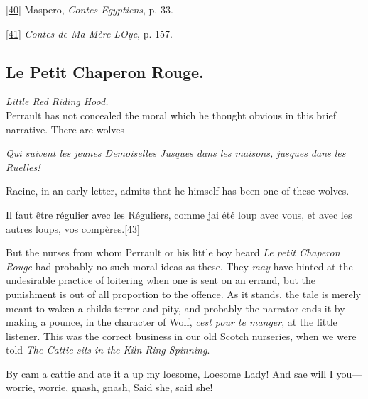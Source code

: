 \documentclass[14pt,a4paper]{memoir}
\begin{document}
\protect\hypertarget{4533318093929944247_33931-h-0.htm.xhtmlux5cux23Footnote_40}{}{}\protect\hyperlink{4533318093929944247_33931-h-0.htm.xhtmlux5cux23FNanchor_40}{{{[}40{]}}}
Maspero, \emph{Contes Egyptiens}, p. 33.

\protect\hypertarget{4533318093929944247_33931-h-0.htm.xhtmlux5cux23Footnote_41}{}{}\protect\hyperlink{4533318093929944247_33931-h-0.htm.xhtmlux5cux23FNanchor_41}{{{[}41{]}}}
\emph{Contes de Ma Mère L\textquotesingle Oye}, p. 157.

\subsection{Le Petit Chaperon Rouge.}

\emph{Little Red Riding Hood.} \\

Perrault has not concealed the moral which he thought obvious in this
brief narrative. There are wolves---

\emph{{\textquotesingle Qui suivent les jeunes Demoiselles} {Jusques
dans les maisons, jusques dans les Ruelles!\textquotesingle{}}}

Racine, in an early letter, admits that he himself has been one of these
wolves.

\textquotesingle Il faut être régulier avec les Réguliers, comme
j\textquotesingle ai été loup avec vous, et avec les autres loups, vos
compères.\protect\hypertarget{4533318093929944247_33931-h-0.htm.xhtmlux5cux23FNanchor_43}{}{}\protect\hyperlink{4533318093929944247_33931-h-0.htm.xhtmlux5cux23Footnote_43}{{[}43{]}}\textquotesingle{}

But the nurses from whom Perrault or his little boy heard \emph{Le petit
Chaperon Rouge} had probably no such moral ideas as these. They
\emph{may} have hinted at the undesirable practice of loitering when one
is sent on an errand, but the punishment is out of all proportion to the
offence. As it stands, the tale is merely meant to waken a
child\textquotesingle s terror and pity, and probably the narrator ends
it by making a pounce, in the character of Wolf,
\emph{c\textquotesingle est pour te manger}, at the little listener.
This was the correct \textquotesingle business\textquotesingle{} in our
old Scotch nurseries, when we were told \emph{The Cattie sits in the
Kiln-Ring Spinning}.

{\textquotesingle By cam\textquotesingle{} a cattie and ate it
a\textquotesingle{} up my loesome,} {Loesome Lady!} {And sae will I
you---worrie, worrie, gnash, gnash,} {Said she, said
she!\textquotesingle{}}
\end{document}
